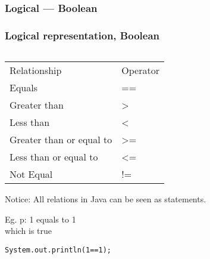 \documentclass[en, 11pt, xcolor=dvipsnames]{beamer}
\begin{document}
\subsubsection{Logical --- Boolean}
\begin{frame}[fragile]
	\frametitle{Logical representation, Boolean}


	\begin{columns}[c]
		\begin{column}{0.9\textwidth}

			\begin{table}
				\begin{tabular}{l l}
					Relationship             & Operator \\
					Equals                   & ==       \\
					Greater than             & >        \\
					Less than                & <        \\
					Greater than or equal to & >=       \\
					Less than or equal to    & <=       \\
					Not Equal                & !=       \\
				\end{tabular}
			\end{table}

			Notice: All relations in Java can be seen as statements.

			\bigskip %

			Eg. p: 1 equals to 1\\
			which is true

			\begin{lstlisting}[style=Java]
System.out.println(1==1);\end{lstlisting}

		\end{column}
	\end{columns}

\end{frame}
\end{document}
